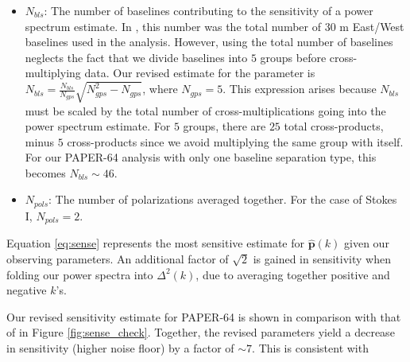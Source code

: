 \documentclass[preprint2,numberedappendix,tighten]{aastex6}  %
\begin{document}
\begin{itemize}
\item $N_{bls}$: The number of baselines contributing to the sensitivity of a power spectrum estimate. In \citet{ali_et_al2015}, this number was the total number of $30$ m East/West baselines used in the analysis. However, using the total number of baselines neglects the fact that we divide baselines into $5$ groups before cross-multiplying data. Our revised estimate for the parameter is $N_{bls} = \frac{N_{bls}}{N_{gps}}\sqrt{N_{gps}^{2}-N_{gps}}$, where $N_{gps} = 5$. This expression arises because $N_{bls}$ must be scaled by the total number of cross-multiplications going into the power spectrum estimate. For $5$ groups, there are $25$ total cross-products, minus $5$ cross-products since we avoid multiplying the same group with itself. For our PAPER-64 analysis with only one baseline separation type, this becomes $N_{bls} \sim 46$. 
\item $N_{pols}$: The number of polarizations averaged together. For the case of Stokes I, $N_{pols}=2$.
\end{itemize}

Equation \ref{eq:sense} represents the most sensitive estimate for $\hat{\textbf{p}}(k)$ given our observing parameters. An additional factor of $\sqrt{2}$ is gained in sensitivity when folding our power spectra into $\Delta^{2}(k)$, due to averaging together positive and negative $k$'s. 

Our revised sensitivity estimate for PAPER-64 is shown in comparison with that of \citet{ali_et_al2015} in Figure \ref{fig:sense_check}. Together, the revised parameters yield a decrease in sensitivity (higher noise floor) by a factor of $\sim7$. This is consistent with 
\end{document}
